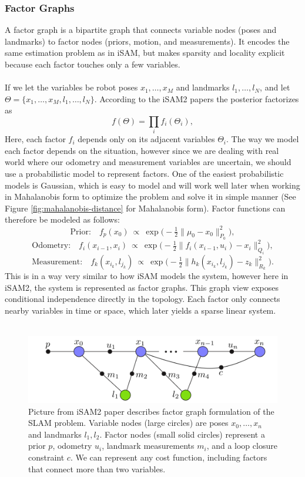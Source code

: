 \subsubsection{Factor Graphs}
A factor graph is a bipartite graph that connects variable nodes (poses and landmarks) to factor nodes (priors, motion, and measurements). It encodes the same estimation problem as in iSAM, but makes sparsity and locality explicit because each factor touches only a few variables.
\\ \\
If we let the variables be robot poses $x_1,\dots,x_M$ and landmarks $l_1,\dots,l_N$, and let $\Theta=\{x_1,\dots,x_M,l_1,\dots,l_N\}$. According to the iSAM2 papers \cite{iSAM2_paper,Bayes_tree_for_SLAM_paper} the posterior factorizes as
\[
    f(\Theta) = \prod_{i} f_i(\Theta_i),
\]
Here, each factor $f_i$ depends only on its adjacent variables $\Theta_i$. The way we model each factor depends on the situation, however since we are dealing with real world where our odometry and measurement variables are uncertain, we should use a probabilistic model to represent factors. One of the easiest probabilistic models is Gaussian, which is easy to model and will work well later when working in Mahalanobis form to optimize the problem and solve it in simple manner (See Figure \ref{fig:mahalanobis-distance} for Mahalanobis form). Factor functions can therefore be modeled as follows:
\[
    \text{Prior:}\quad f_p(x_0)\ \propto\ \exp\!\Big(-\tfrac{1}{2}\|\mu_0 - x_0\|_{P_0}^2\Big),
\]
\[
    \text{Odometry:}\quad f_i(x_{i-1},x_i)\ \propto\ \exp\!\Big(-\tfrac{1}{2}\|f_i(x_{i-1},u_i) - x_i\|_{Q_i}^2\Big),
\]
\[
    \text{Measurement:}\quad f_k(x_{i_k},l_{j_k})\ \propto\ \exp\!\Big(-\tfrac{1}{2}\|h_k(x_{i_k},l_{j_k}) - z_k\|_{R_k}^2\Big).
\]
This is in a way very similar to how iSAM models the system, however here in iSAM2, the system is represented as factor graphs. This graph view exposes conditional independence directly in the topology. Each factor only connects nearby variables in time or space, which later yields a sparse linear system.
\\ \\
\begin{figure}[H]
    \centering
    \includegraphics[width=0.98\linewidth]{Pictures/Optimizers/iSAM2/Factor_graph.png}
    \caption{Picture from iSAM2 paper \cite{iSAM2_paper} describes factor graph formulation of the SLAM problem. Variable nodes (large circles) are poses $x_0,\dots,x_n$ and landmarks $l_1,l_2$. Factor nodes (small solid circles) represent a prior $p$, odometry $u_i$, landmark measurements $m_i$, and a loop closure constraint $c$. We can represent any cost function, including factors that connect more than two variables.}
    \label{fig:optimizer-iSAM2-factor-graph}
\end{figure}

